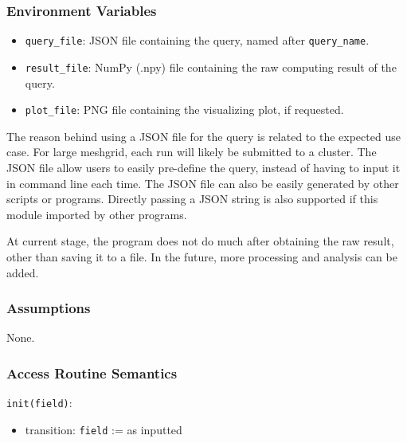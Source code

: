 \documentclass[12pt, titlepage]{article}
\begin{document}
\subsubsection{Environment Variables}
\begin{itemize}
  \item \texttt{query\_file}: JSON file containing the query, named after \texttt{query\_name}.
  \item \texttt{result\_file}: NumPy (.npy) file containing the raw computing result of the query.
  \item \texttt{plot\_file}: PNG file containing the visualizing plot, if requested.
\end{itemize}
\noindent The reason behind using a JSON file for the query is related to the expected use case. For large meshgrid, each run will likely be submitted to a cluster. The JSON file allow users to easily pre-define the query, instead of having to input it in command line each time. The JSON file can also be easily generated by other scripts or programs. Directly passing a JSON string is also supported if this module imported by other programs.

\noindent At current stage, the program does not do much after obtaining the raw result, other than saving it to a file. In the future, more processing and analysis can be added.

\subsubsection{Assumptions}
None.

\subsubsection{Access Routine Semantics}

\noindent \texttt{init(field)}:
\begin{itemize}
\item transition: \texttt{field} := as inputted
\end{itemize}
\end{document}
